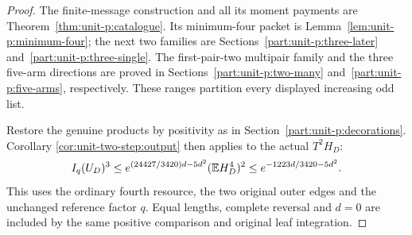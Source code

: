 \begin{proof}
The finite-message construction and all its moment payments are
Theorem~\ref{thm:unit-p:catalogue}. Its minimum-four packet is
Lemma~\ref{lem:unit-p:minimum-four}; the next two families are
Sections~\ref{part:unit-p:three-later}
and~\ref{part:unit-p:three-single}. The first-pair-two multipair
family and the three five-arm directions are proved in
Sections~\ref{part:unit-p:two-many}
and~\ref{part:unit-p:five-arms}, respectively.
These ranges partition every displayed increasing odd list.

Restore the genuine products by positivity as in
Section~\ref{part:unit-p:decorations}. Corollary
\ref{cor:unit-two-step:output} then applies to the actual
\(T^2H_D\):
\[
 I_q(U_D)^3\le
 e^{(24427/3420)d-5d^2}(\mathbb E H_D^4)^2
 \le e^{-1223d/3420-5d^2}.
\]
This uses the ordinary fourth resource, the two original outer
edges and the unchanged reference factor \(q\). Equal lengths,
complete reversal and \(d=0\) are included by the same positive
comparison and original leaf integration.
\end{proof}
